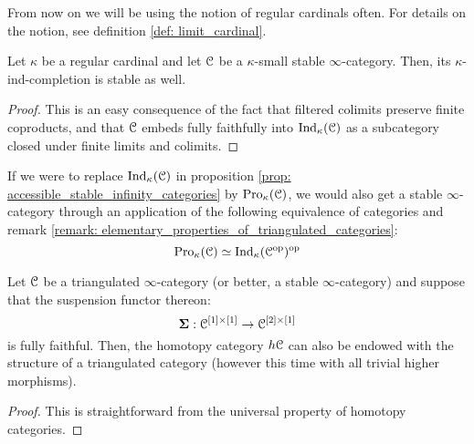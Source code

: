                 \begin{remark}
                    From now on we will be using the notion of regular cardinals often. For details on the notion, see definition \ref{def: limit_cardinal}.
                \end{remark}
                
                \begin{proposition} \label{prop: accessible_stable_infinity_categories}  
                    Let $\kappa$ be a regular cardinal and let $\mathcal{C}$ be a $\kappa$-small stable $\infty$-category. Then, its $\kappa$-ind-completion is stable as well.
                \end{proposition}
                    \begin{proof}
                        This is an easy consequence of the fact that filtered colimits preserve finite coproducts, and that $\mathcal{C}$ embeds fully faithfully into $\mathrm{Ind}_{\kappa}(\mathcal{C})$ as a subcategory closed under finite limits and colimits. 
                    \end{proof}
                \begin{remark}  
                    If we were to replace $\mathrm{Ind}_{\kappa}(\mathcal{C})$ in proposition \ref{prop: accessible_stable_infinity_categories} by $\mathrm{Pro}_{\kappa}(\mathcal{C})$, we would also get a stable $\infty$-category through an application of the following equivalence of categories and remark \ref{remark: elementary_properties_of_triangulated_categories}:
                        $$\mathrm{Pro}_{\kappa}(\mathcal{C}) \simeq \mathrm{Ind}_{\kappa}(\mathcal{C}^{\mathrm{op}})^{\mathrm{op}}$$
                \end{remark}
                
                \begin{proposition} \label{prop: homotopy_category_of_triangulated_categories} 
                    Let $\mathcal{C}$ be a triangulated $\infty$-category (or better, a stable $\infty$-category) and suppose that the suspension functor thereon:
                        $$\suspension: \C^{[1] \x [1]} \to \C^{[2] \x [1]}$$
                    is fully faithful. Then, the homotopy category $h\mathcal{C}$ can also be endowed with the structure of a triangulated category (however this time with all trivial higher morphisms).
                \end{proposition}
                    \begin{proof}
                        This is straightforward from the universal property of homotopy categories. 
                    \end{proof}
                    
